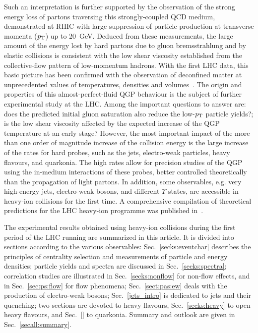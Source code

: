 Such an interpretation is further supported by the observation of the strong energy loss of partons traversing this strongly-coupled QCD medium, demonstrated at RHIC with large suppression of particle production at transverse momenta ($p_{\rm T}$) up to 20~GeV. Deduced from these measurements, the large amount of the energy lost by hard partons due to gluon bremsstrahlung and by elastic collisions is consistent with the low shear viscosity established from the collective-flow pattern of low-momentum hadrons. With the first LHC data, this basic picture has been confirmed with the observation of deconfined matter at unprecedented values of temperatures, densities and volumes~\cite{Muller:2012zq}. The origin and properties of this almost-perfect-fluid QGP behaviour  is the subject of further experimental study at the LHC. Among the important questions to answer are: does the predicted initial gluon saturation also reduce the low-$p_{\rm T}$ particle yields?; is the low shear viscosity affected by the expected increase of the QGP temperature at an early stage? However, the most important impact of the more than one order of magnitude increase of the collision energy is the large increase of the rates for hard probes, such as the jets, electro-weak particles, heavy flavours, and quarkonia. The high rates allow for precision studies of the QGP using the in-medium interactions of these probes, better controlled theoretically than the propagation of light partons. In addition, some observables, e.g. very high-energy jets, electro-weak bosons, and different $\Upsilon$ states, are accessible in heavy-ion collisions for the first time. A comprehensive compilation of theoretical predictions for the LHC heavy-ion programme was published in~\cite{Abreu:2007kv}.

The experimental results obtained using heavy-ion collisions during the first period of the LHC running are summarized in this article. It is divided into sections according to the various observables: Sec.~\ref{secks:eventchar} describes the principles of centrality selection and measurements of particle and energy densities; particle yields and spectra are discussed in Sec.~\ref{secks:spectra}; correlation studies are illustrated in Sec.~\ref{secks:nonflow} for non-flow effects, and in Sec.~\ref{sec:ps:flow} for flow phenomena; Sec.~\ref{sect:pas:ew} deals with the production of electro-weak bosons; Sec.~\ref{jets_intro} is dedicated to jets and their quenching; two sections are devoted to heavy flavours, Sec.~\ref{secks:heavy} to open heavy flavours, and Sec.~\ref{} to quarkonia. Summary and outlook are given in Sec.~\ref{secall:summary}.

